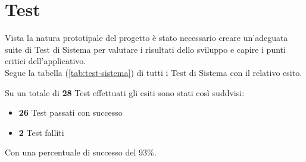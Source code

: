 
\chapter{Test}
\label{cap:verifica-validazione}
Vista la natura prototipale del progetto è stato necessario creare un'adeguata suite di Test di Sistema per valutare i risultati dello sviluppo e capire i punti critici dell'applicativo.\\
Segue la tabella (\ref{tab:test-sistema}) di tutti i Test di Sistema con il relativo esito.

\noindent
Su un totale di \textbf{28} Test effettuati gli esiti sono stati così suddvisi:
\begin{itemize}
\item \textbf{26} Test passati con successo
\item \textbf{2} Test falliti
\end{itemize}
\noindent
Con una percentuale di successo del 93\%.

